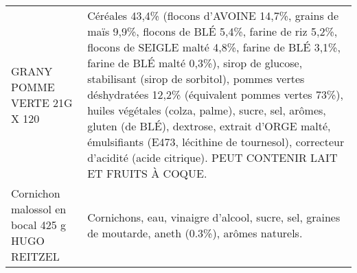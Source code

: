 \begin{longtable}{p{5cm}p{10cm}}
                                                                            GRANY POMME VERTE 21G X 120		 &                                                                                                                                                                                                                                                                                                                                                                                                                                                                                                   Céréales 43,4\% (flocons d'AVOINE 14,7\%, grains de maïs 9,9\%, flocons de BLÉ 5,4\%, farine de riz 5,2\%, flocons de SEIGLE malté 4,8\%, farine de BLÉ 3,1\%, farine de BLÉ malté 0,3\%), sirop de glucose, stabilisant (sirop de sorbitol), pommes vertes déshydratées 12,2\% (équivalent pommes vertes 73\%), huiles végétales (colza, palme), sucre, sel, arômes, gluten (de BLÉ), dextrose, extrait d'ORGE malté, émulsifiants (E473, lécithine de tournesol), correcteur d'acidité (acide citrique). PEUT CONTENIR LAIT ET FRUITS À COQUE. \\
                                                           Cornichon malossol en bocal 425 g HUGO REITZEL &                                                                                                                                                                                                                                                                                                                                                                                                                                                                                                                                                                                                                                                                                                                                                                                                                                                                                                                                      Cornichons, eau, vinaigre d'alcool, sucre, sel, graines de moutarde, aneth (0.3\%), arômes naturels. \\

\end{longtable}
